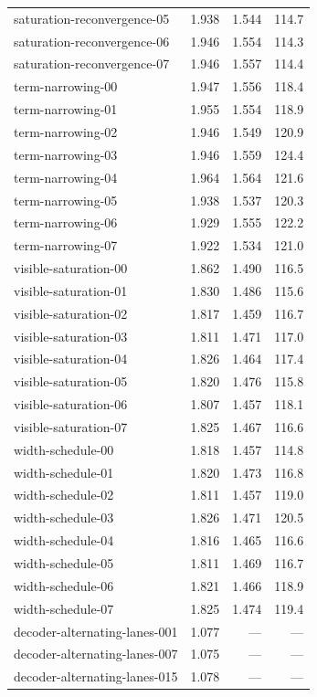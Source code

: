 {\begin{longtable}{lrrr}
saturation-reconvergence-05 & 1.938 & 1.544 & 114.7 \\
saturation-reconvergence-06 & 1.946 & 1.554 & 114.3 \\
saturation-reconvergence-07 & 1.946 & 1.557 & 114.4 \\
term-narrowing-00 & 1.947 & 1.556 & 118.4 \\
term-narrowing-01 & 1.955 & 1.554 & 118.9 \\
term-narrowing-02 & 1.946 & 1.549 & 120.9 \\
term-narrowing-03 & 1.946 & 1.559 & 124.4 \\
term-narrowing-04 & 1.964 & 1.564 & 121.6 \\
term-narrowing-05 & 1.938 & 1.537 & 120.3 \\
term-narrowing-06 & 1.929 & 1.555 & 122.2 \\
term-narrowing-07 & 1.922 & 1.534 & 121.0 \\
visible-saturation-00 & 1.862 & 1.490 & 116.5 \\
visible-saturation-01 & 1.830 & 1.486 & 115.6 \\
visible-saturation-02 & 1.817 & 1.459 & 116.7 \\
visible-saturation-03 & 1.811 & 1.471 & 117.0 \\
visible-saturation-04 & 1.826 & 1.464 & 117.4 \\
visible-saturation-05 & 1.820 & 1.476 & 115.8 \\
visible-saturation-06 & 1.807 & 1.457 & 118.1 \\
visible-saturation-07 & 1.825 & 1.467 & 116.6 \\
width-schedule-00 & 1.818 & 1.457 & 114.8 \\
width-schedule-01 & 1.820 & 1.473 & 116.8 \\
width-schedule-02 & 1.811 & 1.457 & 119.0 \\
width-schedule-03 & 1.826 & 1.471 & 120.5 \\
width-schedule-04 & 1.816 & 1.465 & 116.6 \\
width-schedule-05 & 1.811 & 1.469 & 116.7 \\
width-schedule-06 & 1.821 & 1.466 & 118.9 \\
width-schedule-07 & 1.825 & 1.474 & 119.4 \\
decoder-alternating-lanes-001 & 1.077 & --- & --- \\
decoder-alternating-lanes-007 & 1.075 & --- & --- \\
decoder-alternating-lanes-015 & 1.078 & --- & --- \\

\end{longtable}}
